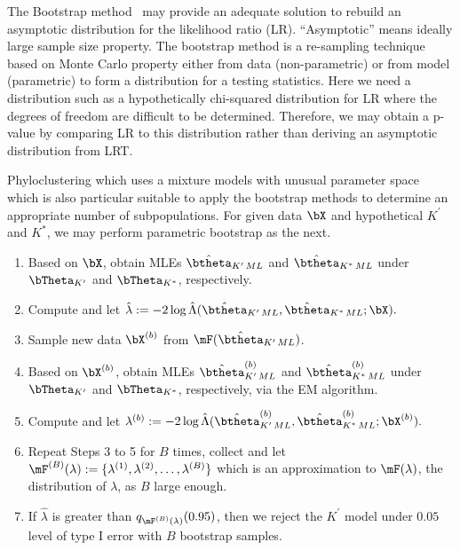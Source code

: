 The Bootstrap method~\citep{Efron1979}
may provide an adequate solution to
rebuild an asymptotic distribution for the likelihood ratio (LR).
``Asymptotic'' means ideally large sample size property.
The bootstrap method is a re-sampling technique
based on Monte Carlo property
either from data (non-parametric)
or from model (parametric) to form a distribution for a testing statistics.
Here we need a distribution such as a
hypothetically chi-squared distribution for LR where the degrees of freedom
are difficult to be determined.
Therefore, we may obtain a p-value by comparing LR to this distribution
rather than deriving an asymptotic distribution from LRT.

Phyloclustering which uses a mixture models with unusual parameter space
which is also particular suitable to apply the bootstrap methods to determine
an appropriate number of subpopulations.
For given data $\bX$ and hypothetical $K^\prime$ and $K^*$,
we may perform parametric bootstrap as the next.
\begin{enumerate}[align=left,label=\bfseries Step \arabic*:]
\item
Based on $\bX$,
obtain MLEs $\hat{\btheta}_{K^\prime\,ML}$ and $\hat{\btheta}_{K^*\,ML}$
under $\bTheta_{K^\prime}$ and $\bTheta_{K^*}$, respectively.

\item
Compute and let
$
  \hat{\lambda} :=
  -2\log \hat{\Lambda}
  (\hat{\btheta}_{K^\prime\,ML},
   \hat{\btheta}_{K^*\,ML}; \bX).
$

\item
Sample new data $\bX^{(b)}$ from $\mF(\hat{\btheta}_{K^\prime\,ML})$.

\item
Based on $\bX^{(b)}$,
obtain MLEs $\hat{\btheta}^{(b)}_{K^\prime\,ML}$ and
$\hat{\btheta}^{(b)}_{K^*\,ML}$
under $\bTheta_{K^\prime}$ and $\bTheta_{K^*}$, respectively,
via the EM algorithm.

\item
Compute and let
$
  \lambda^{(b)} :=
  -2\log \hat{\Lambda}
  (\hat{\btheta}^{(b)}_{K^\prime\,ML},
   \hat{\btheta}^{(b)}_{K^*\,ML}; \bX^{(b)}).
$

\item
Repeat Steps 3 to 5 for $B$ times, collect and let
$\mF^{(B)}(\lambda) := \{\lambda^{(1)}, \lambda^{(2)}, \ldots, \lambda^{(B)}\}$
which is an approximation to $\mF(\lambda)$,
the distribution of $\lambda$, as $B$ large enough.

\item
If $\hat{\lambda}$ is greater than $q_{\mF^{(B)}(\lambda)}(0.95)$, then
we reject the $K^\prime$ model under $0.05$ level of type I error
with $B$ bootstrap samples.

\end{enumerate}
